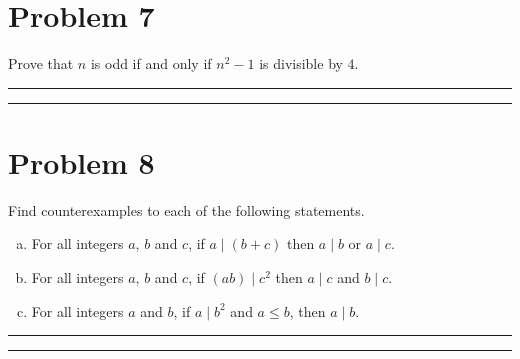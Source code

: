 \documentclass{article}
\theoremstyle{definition}
\newenvironment{solution}{\bigskip\hrule{\hfill}}{\bigskip\hrule{\hfill}} %
\begin{document}

\newpage


\section*{Problem 7}

Prove that $n$ is odd if and only if $n^2-1$ is divisible by $4$.

\begin{solution}


\end{solution}


\newpage


\section*{Problem 8}

Find counterexamples to each of the following statements.

\begin{enumerate}[a)] %
    \item For all integers $a$, $b$ and $c$, if $a\mid\left(b+c\right)$ then $a\mid b$ or $a\mid c$.

    \item For all integers $a$, $b$ and $c$, if $\left(ab\right)\mid c^2$ then $a\mid c$ and $b\mid c$.

    \item For all integers $a$ and $b$, if $a\mid b^2$ and $a\leq b$, then $a\mid b$.
\end{enumerate}

\begin{solution}


\end{solution}
\end{document}
